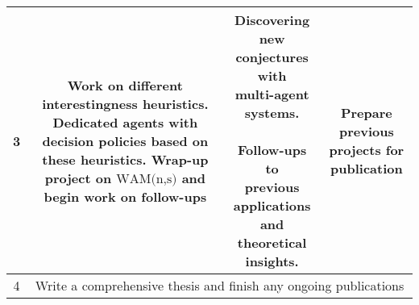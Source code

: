 \begin{longtable}{|c|c|c|c|}
\hline
3 & \makecell[l]{Work on different\\interestingness heuristics.\\Dedicated agents with\\decision policies based\\ on these heuristics.\\\\ Wrap-up project on $\text{WAM(n,s)}$\\ and begin work on follow-ups} & \makecell[l]{Discovering new\\conjectures with\\multi-agent systems.\\\\Follow-ups to\\previous applications\\and theoretical insights.} & \makecell[l]{Prepare previous\\projects for publication}\\
\hline
4 & \multicolumn{3}{|c|}{Write a comprehensive thesis and finish any ongoing publications } \\
\hline
\end{longtable}




